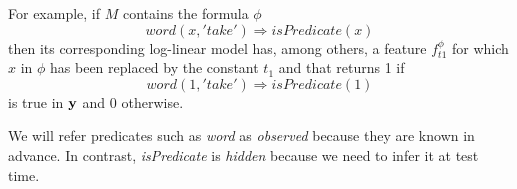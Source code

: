 For example, if $M$ contains the formula $\phi$ \[
word\left(x,'take'\right)\Rightarrow isPredicate\left(x\right)\]
then its corresponding log-linear model has, among others, a feature 
$f_{t1}^{\phi}$ for which $x$ in $\phi$ has been replaced by the constant $t_1$ and that returns 1 if \[
word\left(1,'take'\right)\Rightarrow isPredicate\left(1\right)\]
is true in $\mathbf{y}$ and 0 otherwise.

We will refer predicates such as \emph{word} as \emph{observed} because they are known in advance. In contrast, \emph{isPredicate} is \emph{hidden} because we need to infer it at test time.


